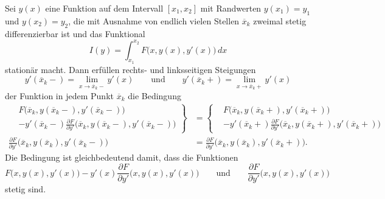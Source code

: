 \begin{satz}
\label{buch:nichtdiff:splines:satz:weierstrass-erdmann}
Sei $y(x)$ eine Funktion auf dem Intervall $[x_1,x_2]$ mit Randwerten
$y(x_1)=y_1$ und $y(x_2)=y_2$, die mit Ausnahme von endlich
vielen Stellen $\overline{x}_k$ zweimal
stetig differenzierbar ist und das Funktional
\[
I(y)
=
\int_{x_1}^{x_2}
F\bigl(x,y(x),y'(x)\bigr)
\,dx
\]
stationär macht.
Dann erfüllen rechts- und linksseitigen Steigungen
\[
y'(\overline{x}_k-) = \lim_{x\to \overline{x}_k-} y'(x)
\qquad\text{und}\qquad
y'(\overline{x}_k+) = \lim_{x\to \overline{x}_k+} y'(x)
\]
der Funktion in jedem Punkt $\overline{x}_k$ die Bedingung
\begin{equation}
\begin{aligned}
\left.
\begin{aligned}
&F\bigl(\overline{x}_k,y(\overline{x}_k-),y'(\overline{x}_k-)\bigr)
\\
&- 
y'(\overline{x}_k-)
\frac{\partial F}{\partial y'}\bigl(\overline{x}_k,y(\overline{x}_k-), y'(\overline{x}_k-)\bigr)
\end{aligned}\right\}
&=
\left\{
\begin{aligned}
&F\bigl(\overline{x}_k,y(\overline{x}_k+),y'(\overline{x}_k+)\bigr)
\\
&- 
y'(\overline{x}_k+)
\frac{\partial F}{\partial y'}\bigl(\overline{x}_k,y(\overline{x}_k+), y'(\overline{x}_k+)\bigr)
\end{aligned}
\right.
\\
\frac{\partial F}{\partial y'}\bigl(
\overline{x}_k,
y(\overline{x}_k),
y'(\overline{x}_k-)
\bigr)
&=
\frac{\partial F}{\partial y'}\bigl(
\overline{x}_k,
y(\overline{x}_k),
y'(\overline{x}_k+)
\bigr).
\end{aligned}
\label{buch:nichtdiff:eckenedingung:eqn:we}
\end{equation}
Die Bedingung ist gleichbedeutend damit, dass die Funktionen
\[
F\bigl(x,y(x),y'(x)\bigr)
-
y'(x)\frac{\partial F}{\partial y'}\bigl(x,y(x),y'(x)\bigr)
\qquad\text{und}\qquad
\frac{\partial F}{\partial y'}\bigl(x,y(x),y'(x)\bigr)
\]
stetig sind.
\end{satz}


